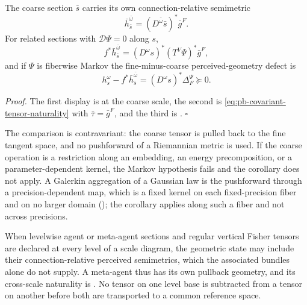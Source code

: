The coarse section \(\bar s\) carries its own connection-relative semimetric
\begin{equation}
\bar h_{\bar s}^{\bar\omega}
=(D^{\bar\omega}\bar s)^*\bar g^F.
\label{eq:pb-meta-perceived-geometry}
\end{equation}
For related sections with \(\mathcal D\Psi=0\) along \(s\),
\begin{equation}
f^*\bar h_{\bar s}^{\bar\omega}
=(D^\omega s)^*(T^V\Psi)^*\bar g^F,
\label{eq:pb-meta-perceived-naturality}
\end{equation}
and if \(\Psi\) is fiberwise Markov the fine-minus-coarse perceived-geometry defect is
\begin{equation}
h_s^\omega-f^*\bar h_{\bar s}^{\bar\omega}
=(D^\omega s)^*\Delta_F^\Psi\succeq0.
\label{eq:pb-meta-perceived-defect}
\end{equation}

\noindent\emph{Proof.}
The first display is  at the coarse scale, the second is
\eqref{eq:pb-covariant-tensor-naturality} with \(\bar\tau=\bar g^F\), and the third is
. \hfill$\square$

The comparison is contravariant: the coarse tensor is pulled back to the fine tangent space, and no
pushforward of a Riemannian metric is used. If the coarse operation is a restriction along an
embedding, an energy precomposition, or a parameter-dependent kernel, the Markov hypothesis fails and
the corollary does not apply. A Galerkin aggregation of a Gaussian law is the pushforward through a
precision-dependent map, which is a fixed kernel on each fixed-precision fiber and on no larger domain
(); the corollary applies along such a fiber and not across
precisions.

When levelwise agent or meta-agent sections and regular vertical Fisher tensors are declared at every
level of a scale diagram, the geometric state may include their connection-relative perceived
semimetrics, which the associated bundles alone do not supply. A meta-agent thus has its own pullback
geometry, and its cross-scale naturality is . No tensor on one
level base is subtracted from a tensor on another before both are transported to a common reference
space.

